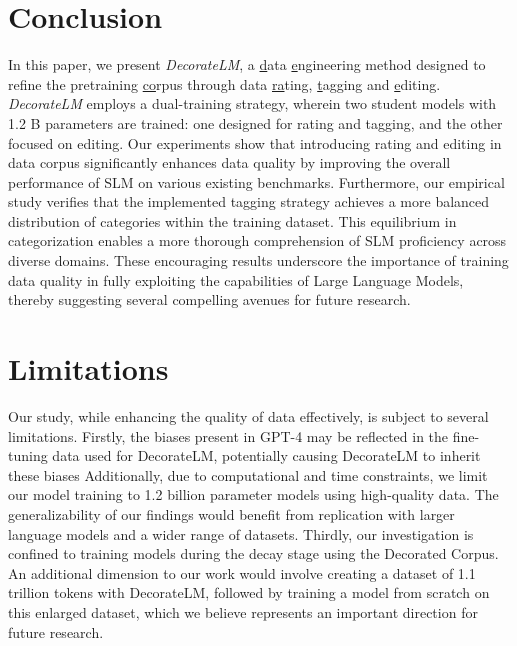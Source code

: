 \documentclass[11pt]{article}
\begin{document}
\vspace{5pt} 
\section{Conclusion}

In this paper, we present \textit{DecorateLM}, a \underline{d}ata \underline{e}ngineering method designed to refine the pretraining \underline{co}rpus through data \underline{ra}ting, \underline{t}agging and \underline{e}diting. \textit{DecorateLM} employs a dual-training strategy, wherein two student models with 1.2 B parameters are trained: one designed for rating and tagging, and the other focused on editing. Our experiments show that introducing rating and editing in data corpus significantly enhances data quality by improving the overall performance of SLM on various existing benchmarks. Furthermore, our empirical study verifies that the implemented tagging strategy achieves a more balanced distribution of categories within the training dataset. This equilibrium in categorization enables a more thorough comprehension of SLM proficiency across diverse domains. These encouraging results underscore the importance of training data quality in fully exploiting the capabilities of Large Language Models, thereby suggesting several compelling avenues for future research.

\newpage
\section{Limitations}

Our study, while enhancing the quality of data effectively, is subject to several limitations.
Firstly, the biases present in GPT-4 may be reflected in the fine-tuning data used for DecorateLM, potentially causing DecorateLM to inherit these biases
Additionally, due to computational and time constraints, we limit our model training to 1.2 billion parameter models using high-quality data. The generalizability of our findings would benefit from replication with larger language models and a wider range of datasets.
Thirdly, our investigation is confined to training models during the decay stage using the Decorated Corpus. An additional dimension to our work would involve creating a dataset of 1.1 trillion tokens with DecorateLM, followed by training a model from scratch on this enlarged dataset, which we believe represents an important direction for future research. 
\end{document}

